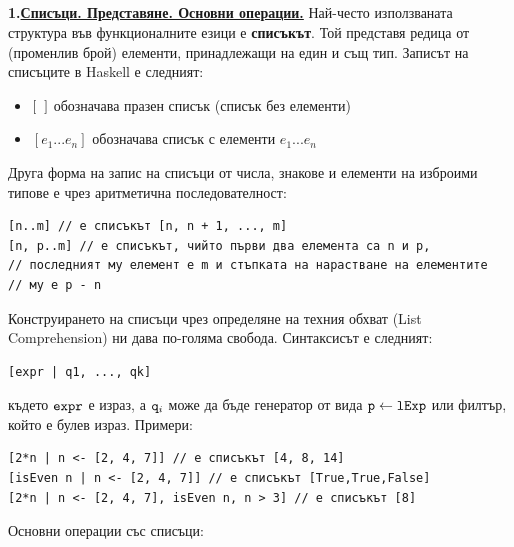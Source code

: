\documentclass{article}
\newcommand{\cppplain}[1]{\textcolor{black}{\texttt{#1}}}
\begin{document}
\subsection*{\color{bordeaux}{20. Функционално програмиране. Списъци. Потоци и отложено оценяване.}}
\textbf{1.\underline{Списъци. Представяне. Основни операции.}} \newline\newline
Най-често използваната структура във функционалните езици е \textbf{списъкът}. Той представя редица от (променлив брой) елементи, принадлежащи на
един и същ тип. Записът на списъците в Haskell е следният:
\begin{itemize}
    \item $[\hspace{0.2cm}]$ обозначава празен списък (списък без елементи)
    \item $[e_1...e_n]$ обозначава списък с елементи $e_1...e_n$
\end{itemize}
Друга форма на запис на списъци от числа, знакове и елементи на изброими типове е чрез аритметична последователност:
\begin{lstlisting}[style=cpp]
[n..m] // е списъкът [n, n + 1, ..., m]
[n, p..m] // е списъкът, чийто първи два елемента са n и p,
// последният му елемент е m и стъпката на нарастване на елементите
// му е p - n 
\end{lstlisting}
Конструирането на списъци чрез определяне на техния обхват (List Comprehension) ни дава по-голяма свобода. Синтаксисът е следният:
\begin{lstlisting}[style=cpp]
[expr | q1, ..., qk]
\end{lstlisting}
където $\cppplain{expr}$ е израз, а $\cppplain{q}_i$ може да бъде генератор от вида $\cppplain{p} \leftarrow \cppplain{lExp}$ или филтър, който е булев израз. \newline\newline
Примери:
\begin{lstlisting}[style=cpp]
[2*n | n <- [2, 4, 7]] // е списъкът [4, 8, 14]
[isEven n | n <- [2, 4, 7]] // е списъкът [True,True,False]
[2*n | n <- [2, 4, 7], isEven n, n > 3] // е списъкът [8]
\end{lstlisting}
Основни операции със списъци:
\end{document}
